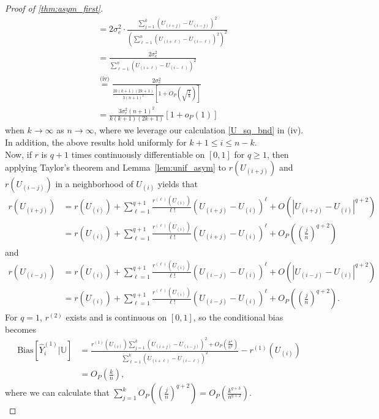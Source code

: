 \documentclass{uwstat572}
\theoremstyle{definition}
\renewcommand{\hat}{\widehat}
\theoremstyle{theorem}
\begin{document}
\begin{proof}[Proof of \autoref{thm:asym_first}]
\begin{align*}
&= 2\sigma_e^2 \cdot \frac{\sum_{j=1}^k \left(U_{(i+j)} - U_{(i-j)}\right)^2}{\left(\sum_{\ell=1}^n (U_{(i+\ell)} - U_{(i-\ell)})^2 \right)^2} \\
&= \frac{2\sigma_e^2}{\sum_{\ell=1}^n (U_{(i+\ell)} - U_{(i-\ell)})^2}\\
&\stackrel{\text{(iv)}}{=} \frac{2\sigma_e^2}{\frac{2k(k+1)(2k+1)}{3(n+1)^2}\left[1+ O_P\left(\sqrt{\frac{1}{k}}\right)\right]}\\
&= \frac{3\sigma_e^2 (n+1)^2}{k(k+1)(2k+1)}\left[1 + o_P(1)\right]
\end{align*}
when $k\to \infty$ as $n\to \infty$, where we leverage our calculation \eqref{U_sq_bnd} in (iv). In addition, the above results hold uniformly for $k+1\leq i \leq n-k$.\\

Now, if $r$ is $q+1$ times continuously differentiable on $[0,1]$ for $q\geq 1$, then applying Taylor's theorem and Lemma~\ref{lem:unif_asym} to $r(U_{(i+j)})$ and $r(U_{(i-j)})$ in a neighborhood of $U_{(i)}$ yields that
\begin{align*}
r(U_{(i+j)}) &= r(U_{(i)}) + \sum_{\ell=1}^{q+1} \frac{r^{(\ell)}(U_{(i)})}{\ell!} \left(U_{(i+j)} - U_{(i)}\right)^{\ell} + O\left(|U_{(i+j)} - U_{(i)}|^{q+2} \right)\\
&= r(U_{(i)}) + \sum_{\ell=1}^{q+1} \frac{r^{(\ell)}(U_{(i)})}{\ell!} \left(U_{(i+j)} - U_{(i)}\right)^{\ell} + O_P\left(\left(\frac{j}{n}\right)^{q+2} \right)
\end{align*}
and 
\begin{align*}
r(U_{(i-j)}) &= r(U_{(i)}) + \sum_{\ell=1}^{q+1} \frac{r^{(\ell)}(U_{(i)})}{\ell!} \left(U_{(i-j)} - U_{(i)}\right)^{\ell} + O\left(|U_{(i-j)} - U_{(i)}|^{q+2} \right)\\
&= r(U_{(i)}) + \sum_{\ell=1}^{q+1} \frac{r^{(\ell)}(U_{(i)})}{\ell!} \left(U_{(i-j)} - U_{(i)}\right)^{\ell} + O_P\left(\left(\frac{j}{n}\right)^{q+2} \right).
\end{align*}
For $q=1$, $r^{(2)}$ exists and is continuous on $[0,1]$, so the conditional bias becomes
\begin{align*}
\mathrm{Bias}\left[\hat{Y}_i^{(1)} \big| \mathbb{U}\right] &= \frac{r^{(1)}(U_{(i)}) \sum_{j=1}^k \left(U_{(i+j)} -U_{(i-j)} \right)^2 + O_P\left(\frac{k^4}{n^3}\right)}{\sum_{\ell=1}^k \left(U_{(i+\ell)} - U_{(i-\ell)}\right)^2} - r^{(1)}(U_{(i)}) \\
&= O_P\left(\frac{k}{n}\right),
\end{align*}
where we can calculate that $\sum_{j=1}^k O_P\left(\left(\frac{j}{n}\right)^{q+2} \right) = O_P\left(\frac{k^{q+3}}{n^{q+2}}\right)$.\\

\end{proof}
\end{document}
